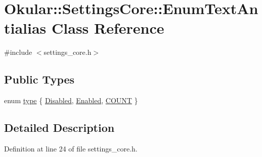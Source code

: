 \hypertarget{classOkular_1_1SettingsCore_1_1EnumTextAntialias}{\section{Okular\+:\+:Settings\+Core\+:\+:Enum\+Text\+Antialias Class Reference}
\label{classOkular_1_1SettingsCore_1_1EnumTextAntialias}
}


{\ttfamily \#include $<$settings\+\_\+core.\+h$>$}

\subsection*{Public Types}
\begin{DoxyCompactItemize}
\item 
enum \hyperlink{classOkular_1_1SettingsCore_1_1EnumTextAntialias_a7609fd32c2acd57b5d3ce4ac3b01a9e4}{type} \{ \hyperlink{classOkular_1_1SettingsCore_1_1EnumTextAntialias_a7609fd32c2acd57b5d3ce4ac3b01a9e4afd7c58c07865239fb469b1e0786810c2}{Disabled}, 
\hyperlink{classOkular_1_1SettingsCore_1_1EnumTextAntialias_a7609fd32c2acd57b5d3ce4ac3b01a9e4ab833e0a93d6d598e69c7fc84b5a134a1}{Enabled}, 
\hyperlink{classOkular_1_1SettingsCore_1_1EnumTextAntialias_a7609fd32c2acd57b5d3ce4ac3b01a9e4a9e0134eb06a8c9dedd81fe80727f898e}{C\+O\+U\+N\+T}
 \}
\end{DoxyCompactItemize}


\subsection{Detailed Description}


Definition at line 24 of file settings\+\_\+core.\+h.



